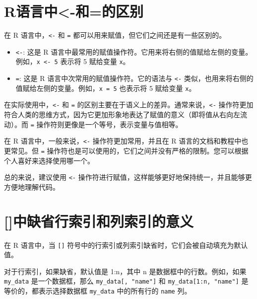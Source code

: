 \documentclass[
  letterpaper,
  DIV=11,
  numbers=noendperiod]{scrreprt}
\providecommand{\tightlist}{%
  \setlength{\itemsep}{0pt}\setlength{\parskip}{0pt}}\usepackage{longtable,booktabs,array}
\begin{document}
\hypertarget{rux8bedux8a00ux4e2d-ux548cux7684ux533aux522b}{%
\section{R语言中\textless-和=的区别}\label{rux8bedux8a00ux4e2d-ux548cux7684ux533aux522b}}

在 R 语言中，\texttt{\textless{}-} 和 \texttt{=}
都可以用来赋值，但它们之间还是有一些区别的。

\begin{itemize}
\tightlist
\item
  \texttt{\textless{}-}: 这是 R
  语言中最常用的赋值操作符。它用来将右侧的值赋给左侧的变量。例如，\texttt{x\ \textless{}-\ 5}
  表示将 5 赋给变量 \texttt{x}。
\item
  \texttt{=}: 这是 R 语言中次常用的赋值操作符。它的语法与
  \texttt{\textless{}-}
  类似，也用来将右侧的值赋给左侧的变量。例如，\texttt{x\ =\ 5} 也表示将
  5 赋给变量 \texttt{x}。
\end{itemize}

在实际使用中，\texttt{\textless{}-} 和 \texttt{=}
的区别主要在于语义上的差异。通常来说，\texttt{\textless{}-}
操作符更加符合人类的思维方式，因为它更加形象地表达了赋值的意义（即将值从右向左流动）。而
\texttt{=} 操作符则更像是一个等号，表示变量与值相等。

在 R 语言中，一般来说，\texttt{\textless{}-} 操作符更加常用，并且在 R
语言的文档和教程中也更常见。但 \texttt{=}
操作符也是可以使用的，它们之间并没有严格的限制。您可以根据个人喜好来选择使用哪一个。

总的来说，建议使用 \texttt{\textless{}-}
操作符进行赋值，这样能够更好地保持统一，并且能够更方便地理解代码。

\hypertarget{ux4e2dux7f3aux7701ux884cux7d22ux5f15ux548cux5217ux7d22ux5f15ux7684ux610fux4e49}{%
\section{{[}{]}中缺省行索引和列索引的意义}\label{ux4e2dux7f3aux7701ux884cux7d22ux5f15ux548cux5217ux7d22ux5f15ux7684ux610fux4e49}}

在 R 语言中，当 \texttt{{[}{]}}
符号中的行索引或列索引缺省时，它们会被自动填充为默认值。

对于行索引，如果缺省，默认值是 1:n，其中 n 是数据框中的行数。例如，如果
\texttt{my\_data} 是一个数据框，那么 \texttt{my\_data{[},\ "name"{]}} 和
\texttt{my\_data{[}1:n,\ "name"{]}} 是等价的，都表示选择数据框
\texttt{my\_data} 中的所有行的 \texttt{name} 列。
\end{document}
